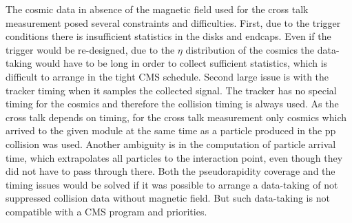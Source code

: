 The cosmic data in absence of the magnetic field used for the cross talk measurement posed several constraints and difficulties. First, due to the trigger conditions there is insufficient statistics in the disks and endcaps. Even if the trigger would be re-designed, due to the $\eta$ distribution of the cosmics the data-taking would have to be long in order to collect sufficient statistics, which is difficult to arrange in the tight CMS schedule. Second large issue is with the tracker timing when it samples the collected signal. The tracker has no special timing for the cosmics and therefore the collision timing is always used.  As the cross talk depends on timing, for the cross talk measurement only cosmics which arrived to the given module at the same time as a particle produced in the pp collision was used. Another ambiguity is in the computation of particle arrival time, which extrapolates all particles to the interaction point, even though they did not have to pass through there. Both the pseudorapidity coverage and the timing issues would be solved if it was possible to arrange a data-taking of not suppressed collision data without magnetic field. But such data-taking is not compatible with a CMS program and priorities.






